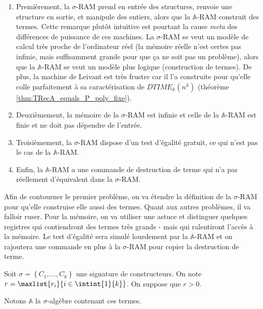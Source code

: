 \documentclass{report}
\newcommand{\bbA}{\mathbb{A}}
\begin{document}
				\begin{enumerate}
					\item 	\label{enum:obs_1} 
							Premièrement, la $\sigma$-RAM prend en entrée des structures, renvoie une structure en sortie, et manipule des entiers, alors que la $\bbA$-RAM construit des termes. Cette remarque plutôt intuitive est pourtant la cause \emph{meta} des différences de puissance de ces machines. La $\sigma$-RAM se veut un modèle de calcul très proche de l'ordinateur réel (la mémoire réelle n'est certes pas infinie, mais suffisamment grande pour que ça ne soit pas un problème), alors que la $\bbA$-RAM se veut un modèle plus logique (construction de termes). De plus, la machine de Leivant est très frustre car il l'a construite pour qu'elle colle parfaitement à sa caractérisation de $DTIME_{\bbA}(n^k)$ (théorème \ref{thm:TRecA_equals_P_poly_fixe}).
							
					\item 	\label{enum:obs_2}
							Deuxièmement, la mémoire de la $\sigma$-RAM est infinie et celle de la $\bbA$-RAM est finie et ne doit pas dépendre de l'entrée.
							
					\item 	\label{enum:obs_3}
							Troisièmement, la $\sigma$-RAM dispose d'un test d'égalité gratuit, ce qui n'est pas le cas de la $\bbA$-RAM.
							
					\item 	\label{enum:obs_4}				
							Enfin, la $\bbA$-RAM a une commande de destruction de terme qui n'a pas réellement d'équivalent dans la $\sigma$-RAM. 
				\end{enumerate}
				
				Afin de contourner le premier problème, on va étendre la définition de la $\sigma$-RAM pour qu'elle construise elle aussi des termes. Quant aux autres problèmes, il va falloir ruser. Pour la mémoire, on va utiliser une astuce et distinguer quelques registres qui contiendront des termes très grands - mais qui ralentiront l'accès à la mémoire. Le test d'égalité sera simulé lourdement par la $\bbA$-RAM et on rajoutera une commande en plus à la $\sigma$-RAM pour copier la destruction de terme. 
				
				\espace
				
				Soit $\sigma = \left\lbrace C_1, \dots, C_k \right\rbrace$ une signature de constructeurs. On note $r = \maxlist{r_i}{i \in \intint{1}{k}}$. On suppose que $r > 0$.
				
				Notons $\bbA$ la $\sigma$-algèbre contenant ces termes.
				
\end{document}
